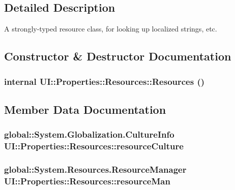\subsection{Detailed Description}
A strongly-\/typed resource class, for looking up localized strings, etc. 

\subsection{Constructor \& Destructor Documentation}
\hypertarget{class_u_i_1_1_properties_1_1_resources_aa31711d7a6220001343ebf336c8234d9}{
\subsubsection[{Resources}]{\setlength{\rightskip}{0pt plus 5cm}internal UI::Properties::Resources::Resources ()}}
\label{class_u_i_1_1_properties_1_1_resources_aa31711d7a6220001343ebf336c8234d9}


\subsection{Member Data Documentation}
\hypertarget{class_u_i_1_1_properties_1_1_resources_a25149ec96c68564c38c6537b958f98bc}{
\subsubsection[{resourceCulture}]{\setlength{\rightskip}{0pt plus 5cm}global::System.Globalization.CultureInfo {\bf UI::Properties::Resources::resourceCulture}}}
\label{class_u_i_1_1_properties_1_1_resources_a25149ec96c68564c38c6537b958f98bc}
\hypertarget{class_u_i_1_1_properties_1_1_resources_a4d67fb5a56b27ed527034330f5614de9}{
\subsubsection[{resourceMan}]{\setlength{\rightskip}{0pt plus 5cm}global::System.Resources.ResourceManager {\bf UI::Properties::Resources::resourceMan}}}
\label{class_u_i_1_1_properties_1_1_resources_a4d67fb5a56b27ed527034330f5614de9}


